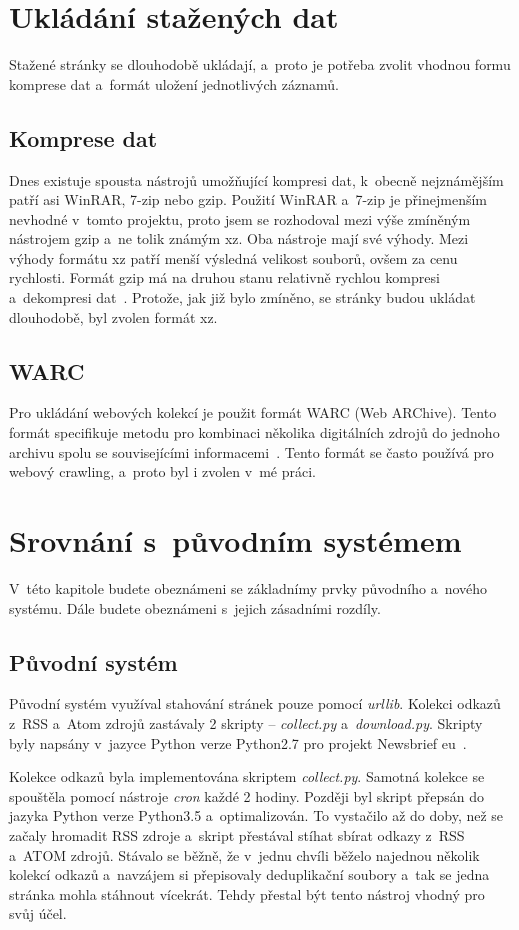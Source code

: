 \section{Ukládání stažených dat}
Stažené stránky se dlouhodobě ukládají, a~proto je potřeba zvolit vhodnou formu komprese dat a~formát uložení jednotlivých záznamů.

\subsection{Komprese dat}
Dnes existuje spousta nástrojů umožňující
kompresi dat, k~obecně nejznámějším patří asi WinRAR, 7-zip nebo gzip. Použití WinRAR a~7-zip je přinejmenším nevhodné v~tomto projektu,
proto jsem se rozhodoval mezi výše zmíněným nástrojem gzip a~ne tolik známým xz. Oba nástroje mají své výhody.
Mezi výhody formátu xz patří menší výsledná velikost souborů, ovšem za cenu rychlosti. Formát gzip má na druhou stanu
relativně rychlou kompresi a~dekompresi dat~\cite{GZIP_VS_XZ}. Protože, jak již bylo zmíněno,
se stránky budou ukládat dlouhodobě, byl zvolen formát xz.

\subsection{WARC}
\label{warc_format}
Pro ukládání webových kolekcí je použit formát WARC (Web ARChive). Tento formát specifikuje metodu pro kombinaci
několika digitálních zdrojů do jednoho archivu spolu se souvisejícími informacemi~\cite{WARC_FROMAT}. Tento formát se často používá
pro webový crawling, a~proto byl i zvolen v~mé práci.

\section{Srovnání s~původním systémem}
V~této kapitole budete obeznámeni se základnímy prvky původního a~nového systému. Dále budete
obeznámeni s~jejich zásadními rozdíly.

\subsection{Původní systém}
Původní systém využíval stahování stránek pouze pomocí \textit{urllib}. Kolekci odkazů z~RSS a~Atom zdrojů zastávaly 2
skripty -- \textit{collect.py} a~\textit{download.py}. Skripty byly napsány v~jazyce Python verze Python2.7 pro projekt
Newsbrief eu~\cite{NEWSBRIEF}.

Kolekce odkazů byla implementována skriptem \textit{collect.py}. Samotná kolekce se spouštěla pomocí nástroje \textit{cron} každé
2 hodiny. Později byl skript přepsán do jazyka Python verze Python3.5 a~optimalizován. To vystačilo až do doby, než se začaly hromadit
RSS zdroje a~skript přestával stíhat sbírat odkazy z~RSS a~ATOM zdrojů. Stávalo se běžně, že v~jednu chvíli běželo najednou několik kolekcí odkazů
a~navzájem si přepisovaly deduplikační soubory a~tak se jedna stránka mohla stáhnout vícekrát. Tehdy přestal být tento nástroj vhodný
pro svůj účel.

